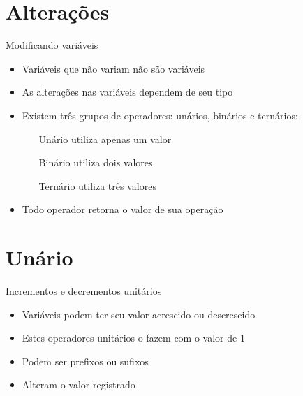 \documentclass[11pt]{beamer}
\subtitle{Qual o resultado?}
\begin{document}
\titlepage

\begin{frame}
	\tableofcontents
\end{frame}

\section{Alterações}
	\begin{frame}{Modificando variáveis}
		\begin{itemize}
			\presentationPause\item Variáveis que não variam não são variáveis
			\presentationPause\item As alterações nas variáveis dependem de seu tipo
			\presentationPause\item Existem três grupos de operadores: unários, binários e ternários:
			\begin{itemize}
				\presentationPause\item[Unário] utiliza apenas um valor
				\presentationPause\item[Binário] utiliza dois valores
				\presentationPause\item[Ternário] utiliza três valores
			\end{itemize}
			\presentationPause\item Todo operador retorna o valor de sua operação
		\end{itemize}
	\end{frame}

\section{Unário}
	\begin{frame}{Incrementos e decrementos unitários}
		\only<1>
		{	
			\begin{itemize}
				\presentationPause\item Variáveis podem ter seu valor acrescido ou descrescido
				\presentationPause\item Estes operadores unitários o fazem com o valor de 1
				\presentationPause\item Podem ser prefixos ou sufixos
				\presentationPause\item Alteram o valor registrado
			\end{itemize}
			\presentationPause
		}
		{
			\presentationPause
		}
	\end{frame}
\end{document}
